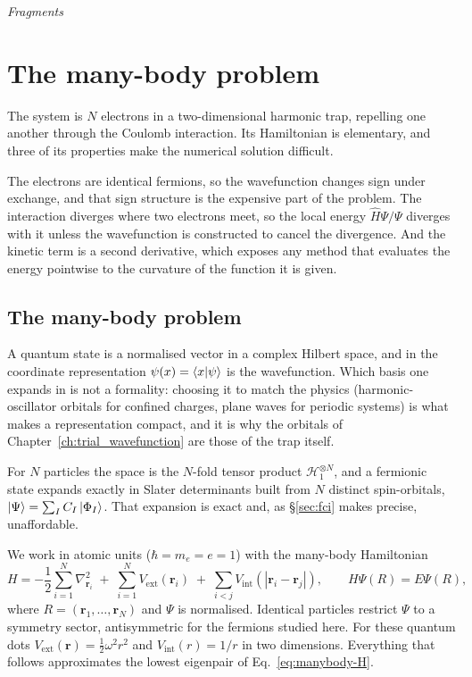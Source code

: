 \graphicspath{{../results/figures/theory/}{../results/figures/}}
{\textit{Fragments}}

\begingroup
\let\clearpage\relax
\let\cleardoublepage\relax
\chapter{The many-body problem}
\label{sec:theory}
\endgroup

The system is $N$ electrons in a two-dimensional harmonic trap, repelling one another
through the Coulomb interaction. Its Hamiltonian is elementary, and three of its properties
make the numerical solution difficult.

The electrons are identical fermions, so the wavefunction changes sign under exchange, and
that sign structure is the expensive part of the problem. The interaction diverges where
two electrons meet, so the local energy $\hat H\Psi/\Psi$ diverges with it unless the
wavefunction is constructed to cancel the divergence. And the kinetic term is a second
derivative, which exposes any method that evaluates the energy pointwise to the curvature
of the function it is given.

\section{The many-body problem}
\label{sec:qm-setup}

A quantum state is a normalised vector in a complex Hilbert space, and in the coordinate
representation $\psi(x)=\braket{x|\psi}$ is the wavefunction. Which basis one expands in is
not a formality: choosing it to match the physics (harmonic-oscillator orbitals for confined charges, plane waves for periodic systems) is what makes a representation compact, and it is
why the orbitals of Chapter~\ref{ch:trial_wavefunction} are those of the trap itself.

For $N$ particles the space is the $N$-fold tensor product $\mathcal H_1^{\otimes N}$, and a
fermionic state expands exactly in Slater determinants built from $N$ distinct spin-orbitals,
$\ket\Psi=\sum_I C_I\ket{\Phi_I}$. That expansion is exact and, as \S\ref{sec:fci} makes
precise, unaffordable.

We work in atomic units ($\hbar=m_e=e=1$) with the many-body Hamiltonian
\begin{equation}
H = -\frac12 \sum_{i=1}^N \nabla_{\mathbf r_i}^2
    \;+\; \sum_{i=1}^N V_{\mathrm{ext}}(\mathbf r_i)
    \;+\; \sum_{i<j} V_{\mathrm{int}}(|\mathbf r_i-\mathbf r_j|),
\qquad H\Psi(R)=E\Psi(R),
\label{eq:manybody-H}
\end{equation}
where $R=(\mathbf r_1,\ldots,\mathbf r_N)$ and $\Psi$ is normalised. Identical particles
restrict $\Psi$ to a symmetry sector, antisymmetric for the fermions studied here. For these
quantum dots $V_{\mathrm{ext}}(\mathbf r)=\tfrac12\omega^2r^2$ and $V_{\mathrm{int}}(r)=1/r$
in two dimensions. Everything that follows approximates the lowest eigenpair of
Eq.~\eqref{eq:manybody-H}.


